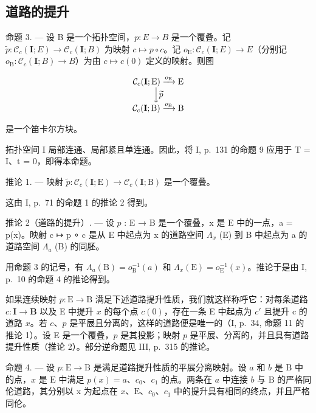 \subsection{道路的提升}

命题 3. --- 设 B 是一个拓扑空间，\(p\colon E \to B\) 是一个覆叠。记 \(\widetilde{p}\colon \mathcal{C}_{c}(\mathbf{I};E) \to \mathcal{C}_{c}(\mathbf{I};B)\) 为映射 \(c \mapsto p \circ c\)。记 \(o_{\mathrm{E}}\colon \mathcal{C}_{c}(\mathbf{I};E) \to E\)（分别记 \(o_{\mathrm{B}}\colon \mathcal{C}_{c}(\mathbf{I};B) \to B\)）为由 \(c \mapsto c(0)\) 定义的映射。则图

\[
\begin{array}{c} \mathcal {C} _ {c} (\mathbf {I}; \mathrm{E}) \xrightarrow {o _ {\mathrm{E}}} \mathrm{E} \\ \Big \downarrow \widetilde {p} \\ \mathcal {C} _ {c} (\mathbf {I}; \mathrm{B}) \xrightarrow {o _ {\mathrm{B}}} \mathrm{B} \end{array}
\]

是一个笛卡尔方块。

拓扑空间 I 局部连通、局部紧且单连通。因此，将 I, p.~131 的命题 9 应用于 T = I、t = 0，即得本命题。

推论 1. --- 映射 \(\widetilde{p}\colon\mathcal{C}_{c}(\mathbf{I};\mathrm{E})\to\mathcal{C}_{c}(\mathbf{I};\mathrm{B})\) 是一个覆叠。

这由 I, p.~71 的命题 1 的推论 2 得到。

推论 2（道路的提升）. --- 设 \(p\) : E → B 是一个覆叠，x 是 E 中的一点，a = p(x)。映射 c ↦ p ∘ c 是从 E 中起点为 x 的道路空间 \(\Lambda_x\) (E) 到 B 中起点为 a 的道路空间 \(\Lambda_a\) (B) 的同胚。

用命题 3 的记号，有 \(\Lambda_{a}(\mathrm{B}) = o_{\mathrm{B}}^{-1}(a)\) 和 \(\Lambda_x(\mathrm{E}) = o_{\mathrm{E}}^{-1}(x)\)。推论于是由 I, p.~10 的命题 4 的推论得到。

如果连续映射 \(p \colon \mathrm{E} \to \mathrm{B}\) 满足下述道路提升性质，我们就这样称呼它：对每条道路 \(c \colon \mathbf{I} \to \mathbf{B}\) 以及 E 中提升 \(x\) 的每个点 \(c(0)\)，存在一条 E 中起点为 \(c'\) 且提升 c 的道路 \(x\)。若 \(c\)、\(p\) 是平展且分离的，这样的道路便是唯一的（I, p.~34, 命题 11 的推论 1）。设 E 是一个覆叠，\(p\) 是其投影；映射 \(p\) 是平展、分离的，并且具有道路提升性质（推论 2）。部分逆命题见 III, p.~315 的推论。

命题 4. --- 设 \(p \colon \mathrm{E} \to \mathrm{B}\) 是满足道路提升性质的平展分离映射。设 \(a\) 和 \(b\) 是 \(\mathrm{B}\) 中的点，\(x\) 是 \(\mathrm{E}\) 中满足 \(p(x) = a\)、\(c_0\)、\(c_1\) 的点。两条在 \(a\) 中连接 \(b\) 与 \(\mathrm{B}\) 的严格同伦道路，其分别以 x 为起点在 \(x\)、\(\mathrm{E}\)、\(c_0\)、\(c_1\) 中的提升具有相同的终点，并且严格同伦。

